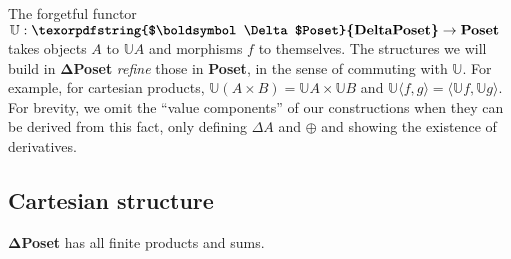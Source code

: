 \documentclass{rntz}\usepackage[a5]{rntzgeometry}\usepackage[fullwidth=130mm,width=330pt,]{narrow}
\newcommand\cat\textbf
\newcommand\CP{\cat{\texorpdfstring{$\boldsymbol\Delta$Poset}{DeltaPoset}}}
\newcommand\Poset{\cat{Poset}}
\newcommand\D\Delta
\newcommand\x\times
\newcommand\<{\mskip 4mu plus 4mu minus 1mu}
\newcommand\valfn{\ensuremath{\mathbb{U}}}
\newcommand\vals{\valfn}
\newcommand\chgs[1]{\D{#1}}
\newcommand\fork[1]{\langle{#1}\rangle}
\begin{document}
The forgetful functor $\valfn : \CP \to \Poset$ takes objects $A$ to $\vals{A}$
and morphisms $f$ to themselves. The structures we will build in \CP{}
\emph{refine} those in \Poset{}, in the sense of commuting with $\valfn$. For
example, for cartesian products, $\vals{(A \x B)} = \vals{A} \x \vals{B}$ and
$\vals{\fork{f,g}} = \fork{\vals f, \vals g}$.
%
For brevity, we omit the ``value components'' of our constructions when they can
be derived from this fact, only defining $\chgs{A}$ and $\oplus$ and showing the
existence of derivatives.


\subsection{Cartesian structure}

\begin{theorem}
  \CP{} has all finite products and sums.
\end{theorem}
\end{document}
